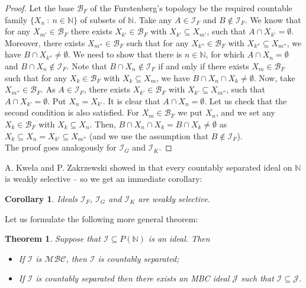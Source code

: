 \documentclass{amsart}
\newtheorem{thm}{Theorem}
\newtheorem{cor}{Corollary}
\theoremstyle{definition}
\newtheorem{remark}{Remark}
\theoremstyle{definition}
\newcommand{\N}{{\mathbb N}}
\newcommand{\I}{\mathcal I}
\newcommand{\J}{\mathcal J}
\newcommand{\B}{\mathcal{B}}
\newcommand{\MBC}{\mathcal{MBC}}
\begin{document}
\begin{proof}
Let the base $\B_F$ of the Furstenberg's topology be the required countable family $\{X_n\ :\ n\in\N\}$ of subsets of $\N$. Take any $A\in \I_F$ and $B\notin \I_F$. We know that for any $X_{m'} \in \B_F$ there exists $X_{k'} \in \B_F$ with $X_{k'} \subseteq X_{m'}$, such that $A\cap X_{k'} = \emptyset$. Moreover, there exists $X_{m''} \in \B_F$ such that for any $X_{k''} \in \B_F$ with $X_{k''} \subseteq X_{m''}$, we have $B\cap X_{k''} \neq \emptyset$. 
We need to show that there is $n\in\N$, for which $A\cap X_n=\emptyset$ and $B\cap X_n\notin \I_F$. Note that $B\cap X_n\notin \I_F$ if and only if there exists $X_{m} \in \B_F$ such that for any $X_{k} \in \B_F$ with $X_{k} \subseteq X_{m}$, we have $B\cap X_n\cap X_{k} \neq \emptyset$. 
Now, take $X_{m''} \in \B_F$. As $A\in\I_F$, there exists $X_{k'} \in \B_F$ with $X_{k'} \subseteq X_{m''}$, such that $A\cap X_{k'} = \emptyset$. Put $X_n = X_{k'}$. It is clear that $A\cap X_n = \emptyset$. Let us check that the second condition is also satisfied. For $X_{m} \in \B_F$ we put $X_n$, and we set any $X_{k} \in \B_F$ with $X_{k} \subseteq X_n$. Then, $B\cap X_n\cap X_{k} = B\cap X_{k}\neq \emptyset$ as $X_k \subseteq X_n = X_{k'} \subseteq X_{m''}$ (and we use the assumption that $B\notin \I_F$).\\
The proof goes analogously for $\I_G$ and $\I_K$.
\end{proof}

A. Kwela and P. Zakrzewski showed in \cite[Proposition 4.3]{KwelaZak} that every countably separated ideal on $\N$ is weakly selective -- so we get an immediate corollary:

\begin{cor}
Ideals $\I_F$, $\I_G$ and $\I_K$ are weakly selective.
\end{cor}

Let us formulate the following more general theorem:

\begin{thm}
Suppose that $\I \subseteq P(\N)$ is an ideal. Then
\begin{itemize}
\item If $\I$ is $\MBC$, then $\I$ is 
countably separated;
\item If $\I$ is countably separated then there 
exists an MBC ideal $\J$ such that $\I \subseteq \J$.
\end{itemize}
\end{thm}
\end{document}
